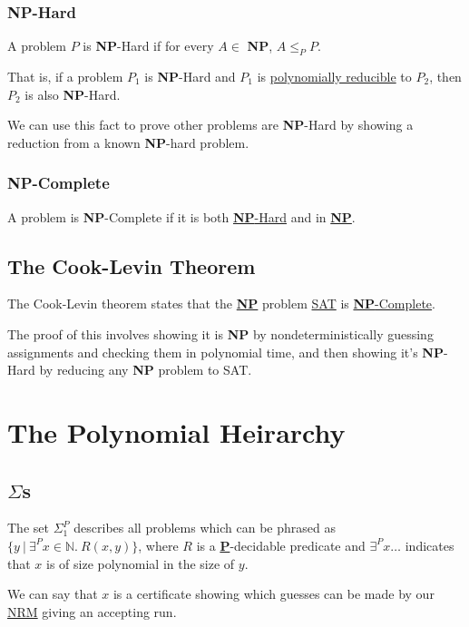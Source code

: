 \documentclass{article}
\begin{document}
\subsubsection{NP-Hard}\label{np-hard}
A problem $P$ is \textbf{NP}-Hard if for every $A \in$ \textbf{NP}, $A \leq_P P$.

That is, if a problem $P_1$ is \textbf{NP}-Hard and $P_1$ is \hyperref[polynomial-reduction]{polynomially reducible} to $P_2$, then $P_2$ is also \textbf{NP}-Hard.

We can use this fact to prove other problems are \textbf{NP}-Hard by showing a reduction from a known \textbf{NP}-hard problem.

\subsubsection{NP-Complete}\label{np-complete}
A problem is \textbf{NP}-Complete if it is both \hyperref[np-hard]{\textbf{NP}-Hard} and in \hyperref[np]{\textbf{NP}}.

\subsection{The Cook-Levin Theorem}
The Cook-Levin theorem states that the \hyperref[NP]{\textbf{NP}} problem \hyperref[sat]{SAT} is \hyperref[np-complete]{\textbf{NP}-Complete}.

The proof of this involves showing it is \textbf{NP} by nondeterministically guessing assignments and checking them in polynomial time, and then showing it's \textbf{NP}-Hard by reducing any \textbf{NP} problem to SAT.

\newpage

\section{The Polynomial Heirarchy}
\subsection{$\Sigma$s}
The set $\Sigma_1^P$ describes all problems which can be phrased as $\{y \:|\: \exists^P x \in \mathbb{N}.\: R(x,y)\}$, where $R$ is a \hyperref[P]{\textbf{P}}-decidable predicate and $\exists^P x \dots$ indicates that $x$ is of size polynomial in the size of $y$.

We can say that $x$ is a certificate showing which guesses can be made by our \hyperref[nrm]{NRM} giving an accepting run.
\end{document}
